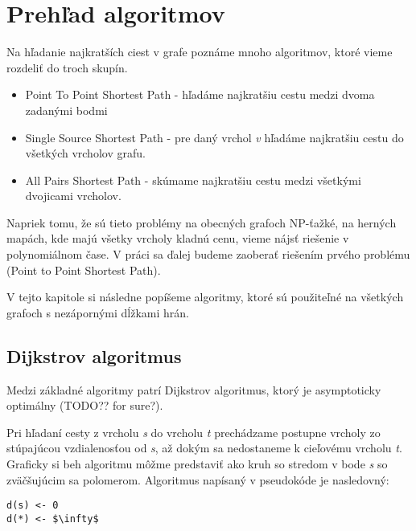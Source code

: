 \chapter{Prehľad algoritmov}
Na hľadanie najkratších ciest v grafe poznáme mnoho algoritmov, ktoré vieme rozdeliť do troch skupín.


\begin{itemize}
\item Point To Point Shortest Path - hľadáme najkratšiu cestu medzi dvoma zadanými bodmi
\item Single Source Shortest Path - pre daný vrchol {\sl v} hľadáme najkratšiu cestu do všetkých vrcholov grafu.
\item All Pairs Shortest Path - skúmame najkratšiu cestu medzi všetkými dvojicami vrcholov.
\end{itemize}

Napriek tomu, že sú tieto problémy na obecných grafoch NP-ťažké, na herných mapách, kde majú všetky vrcholy kladnú cenu, vieme nájsť riešenie v polynomiálnom čase.
V práci sa ďalej budeme zaoberať riešením prvého problému (Point to Point Shortest Path).

V tejto kapitole si následne popíšeme algoritmy, ktoré sú použiteľné na všetkých grafoch 
s nezápornými dĺžkami hrán.

\section{Dijkstrov algoritmus}
Medzi základné algoritmy patrí Dijkstrov algoritmus, ktorý je asymptoticky optimálny (TODO?? for sure?).

Pri hľadaní cesty z vrcholu {\sl s} do vrcholu {\sl t} prechádzame postupne vrcholy zo stúpajúcou vzdialenosťou od {\sl s}, až dokým sa nedostaneme k cieľovému vrcholu {\sl t}.
Graficky si beh algoritmu môžme predstaviť ako kruh so stredom v bode {\sl s} so zväčšujúcim sa polomerom. Algoritmus napísaný v pseudokóde je nasledovný:

\begin{lstlisting}
d(s) <- 0
d(*) <- $\infty$


\end{lstlisting}



